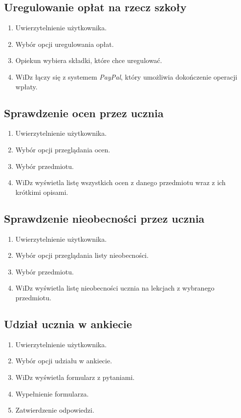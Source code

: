 \documentclass[12pt,leqno,twoside]{mwart}
\begin{document}
\subsection{Uregulowanie opłat na rzecz szkoły}
\begin{enumerate}
\item Uwierzytelnienie użytkownika.
\item Wybór opcji uregulowania opłat.
\item Opiekun wybiera składki, które chce uregulować.
\item WiDz łączy się z systemem \textit{PayPal}, który umożliwia dokończenie operacji wpłaty.
\end{enumerate}
\subsection{Sprawdzenie ocen przez ucznia}
\begin{enumerate}
\item Uwierzytelnienie użytkownika.
\item Wybór opcji przeglądania ocen.
\item Wybór przedmiotu.
\item WiDz wyświetla listę wszystkich ocen z danego przedmiotu wraz z ich krótkimi opisami.
\end{enumerate}
\subsection{Sprawdzenie nieobecności przez ucznia}
\begin{enumerate}
\item Uwierzytelnienie użytkownika.
\item Wybór opcji przeglądania listy nieobecności.
\item Wybór przedmiotu.
\item WiDz wyświetla listę nieobecności ucznia na lekcjach z wybranego przedmiotu.
\end{enumerate}
\subsection{Udział ucznia w ankiecie}
\begin{enumerate}
\item Uwierzytelnienie użytkownika.
\item Wybór opcji udziału w ankiecie.
\item WiDz wyświetla formularz z pytaniami.
\item Wypełnienie formularza.
\item Zatwierdzenie odpowiedzi.
\end{enumerate}
\end{document}
